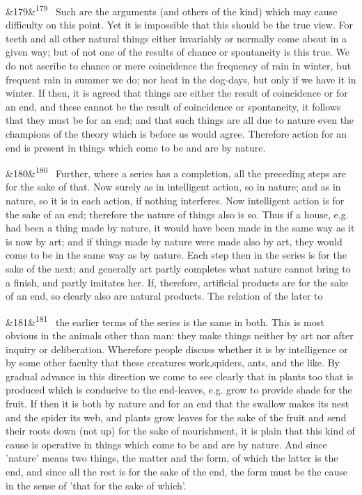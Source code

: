 \documentclass[12pt]{article}
\newcommand{\para}[1][]{\par\noindent\ifx&#1&\else\textsuperscript{\footnotesize #1}~\fi}
\begin{document}
\para[179] Such are the arguments (and others of the kind) which may cause difficulty on this point. Yet it is impossible that this should be the true view. For teeth and all other natural things either invariably or normally come about in a given way; but of not one of the results of chance or spontaneity is this true. We do not ascribe to chance or mere coincidence the frequency of rain in winter, but frequent rain in summer we do; nor heat in the dog-days, but only if we have it in winter. If then, it is agreed that things are either the result of coincidence or for an end, and these cannot be the result of coincidence or spontaneity, it follows that they must be for an end; and that such things are all due to nature even the champions of the theory which is before us would agree. Therefore action for an end is present in things which come to be and are by nature.

\para[180] Further, where a series has a completion, all the preceding steps are for the sake of that. Now surely as in intelligent action, so in nature; and as in nature, so it is in each action, if nothing interferes. Now intelligent action is for the sake of an end; therefore the nature of things also is so. Thus if a house, e.g. had been a thing made by nature, it would have been made in the same way as it is now by art; and if things made by nature were made also by art, they would come to be in the same way as by nature. Each step then in the series is for the sake of the next; and generally art partly completes what nature cannot bring to a finish, and partly imitates her. If, therefore, artificial products are for the sake of an end, so clearly also are natural products. The relation of the later to

\para[181] the earlier terms of the series is the same in both. This is most obvious in the animals other than man: they make things neither by art nor after inquiry or deliberation. Wherefore people discuss whether it is by intelligence or by some other faculty that these creatures work,spiders, ants, and the like. By gradual advance in this direction we come to see clearly that in plants too that is produced which is conducive to the end-leaves, e.g. grow to provide shade for the fruit. If then it is both by nature and for an end that the swallow makes its nest and the spider its web, and plants grow leaves for the sake of the fruit and send their roots down (not up) for the sake of nourishment, it is plain that this kind of cause is operative in things which come to be and are by nature. And since 'nature' means two things, the matter and the form, of which the latter is the end, and since all the rest is for the sake of the end, the form must be the cause in the sense of 'that for the sake of which'.
\end{document}
